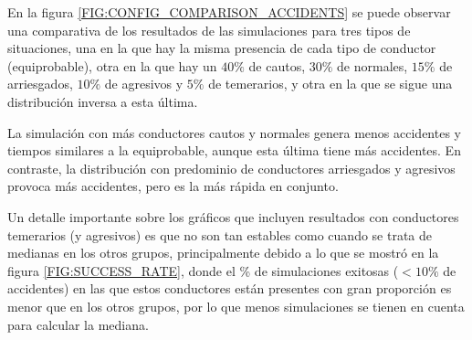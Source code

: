 En la figura \ref{FIG:CONFIG_COMPARISON_ACCIDENTS} se puede observar una comparativa de los resultados de las simulaciones para tres tipos de situaciones,
una en la que hay la misma presencia de cada tipo de conductor (equiprobable), otra en la que hay un $40\%$ de cautos, $30\%$ de normales,
$15\%$ de arriesgados, $10\%$ de agresivos y $5\%$ de temerarios, y otra en la que se sigue una distribución inversa a esta última.

La simulación con más conductores cautos y normales genera menos accidentes y tiempos similares a la equiprobable,
aunque esta última tiene más accidentes. En contraste, la distribución con predominio de conductores arriesgados y agresivos provoca más accidentes,
pero es la más rápida en conjunto.

Un detalle importante sobre los gráficos que incluyen resultados con conductores temerarios (y agresivos) es que no son tan estables como
cuando se trata de medianas en los otros grupos, principalmente debido a lo que se mostró en la figura \ref{FIG:SUCCESS_RATE}, donde el \%
de simulaciones exitosas ($<10\%$ de accidentes) en las que estos conductores están presentes con gran proporción es menor que en los otros grupos,
por lo que menos simulaciones se tienen en cuenta para calcular la mediana.



